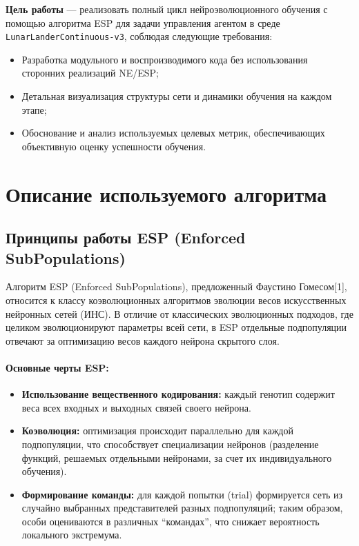 \documentclass[a4paper,12pt]{article}
\begin{document}
\textbf{Цель работы} — реализовать полный цикл нейроэволюционного обучения с помощью алгоритма ESP для задачи управления агентом в среде \texttt{LunarLanderContinuous-v3}, соблюдая следующие требования:
\begin{itemize}
	\item Разработка модульного и воспроизводимого кода без использования сторонних реализаций NE/ESP;
	\item Детальная визуализация структуры сети и динамики обучения на каждом этапе;
	\item Обоснование и анализ используемых целевых метрик, обеспечивающих объективную оценку успешности обучения.
\end{itemize}

\section{Описание используемого алгоритма}

\subsection{Принципы работы ESP (Enforced SubPopulations)}
Алгоритм ESP (Enforced SubPopulations), предложенный Фаустино Гомесом[1], относится к классу коэволюционных алгоритмов эволюции весов искусственных нейронных сетей (ИНС). В отличие от классических эволюционных подходов, где целиком эволюционируют параметры всей сети, в ESP отдельные подпопуляции отвечают за оптимизацию весов каждого нейрона скрытого слоя.

\paragraph{Основные черты ESP:}
\begin{itemize}
	\item \textbf{Использование вещественного кодирования:} каждый генотип содержит веса всех входных и выходных связей своего нейрона.
	\item \textbf{Коэволюция:} оптимизация происходит параллельно для каждой подпопуляции, что способствует специализации нейронов (разделение функций, решаемых отдельными нейронами, за счет их индивидуального обучения).
	\item \textbf{Формирование команды:} для каждой попытки (trial) формируется сеть из случайно выбранных представителей разных подпопуляций; таким образом, особи оцениваются в различных ``командах'', что снижает вероятность локального экстремума.
\end{itemize}
\end{document}
